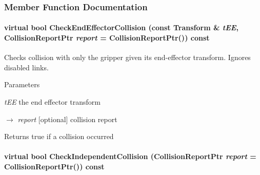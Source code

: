 \subsubsection{Member Function Documentation}
\hypertarget{classOpenRAVE_1_1RobotBase_1_1Manipulator_a409973001a95f36e715c2f227fd28c5a}{
\paragraph[{CheckEndEffectorCollision}]{\setlength{\rightskip}{0pt plus 5cm}virtual bool CheckEndEffectorCollision (const Transform \& {\em tEE}, \/  CollisionReportPtr {\em report} = {\ttfamily CollisionReportPtr()}) const}\hfill}
\label{classOpenRAVE_1_1RobotBase_1_1Manipulator_a409973001a95f36e715c2f227fd28c5a}


Checks collision with only the gripper given its end-\/effector transform. Ignores disabled links. 


\begin{DoxyParams}{Parameters}
\item[{\em tEE}]the end effector transform \item[\mbox{$\rightarrow$} {\em report}]\mbox{[}optional\mbox{]} collision report \end{DoxyParams}
\begin{DoxyReturn}{Returns}
true if a collision occurred 
\end{DoxyReturn}
\hypertarget{classOpenRAVE_1_1RobotBase_1_1Manipulator_a03b7a7ec9520a1302bbfd13ac2e2e225}{
\paragraph[{CheckIndependentCollision}]{\setlength{\rightskip}{0pt plus 5cm}virtual bool CheckIndependentCollision (CollisionReportPtr {\em report} = {\ttfamily CollisionReportPtr()}) const}\hfill}
\label{classOpenRAVE_1_1RobotBase_1_1Manipulator_a03b7a7ec9520a1302bbfd13ac2e2e225}


